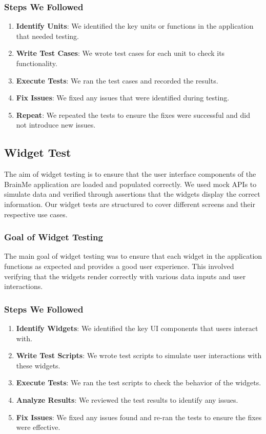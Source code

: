 \subsubsection{Steps We Followed}

\begin{enumerate}
    \item \textbf{Identify Units}: We identified the key units or functions in the application that needed testing.
    \item \textbf{Write Test Cases}: We wrote test cases for each unit to check its functionality.
    \item \textbf{Execute Tests}: We ran the test cases and recorded the results.
    \item \textbf{Fix Issues}: We fixed any issues that were identified during testing.
    \item \textbf{Repeat}: We repeated the tests to ensure the fixes were successful and did not introduce new issues.
\end{enumerate}

\subsection{Widget Test}

The aim of widget testing is to ensure that the user interface components of the BrainMe application are loaded and populated correctly. We used mock APIs to simulate data and verified through assertions that the widgets display the correct information. Our widget tests are structured to cover different screens and their respective use cases.

\subsubsection{Goal of Widget Testing}

The main goal of widget testing was to ensure that each widget in the application functions as expected and provides a good user experience. This involved verifying that the widgets render correctly with various data inputs and user interactions.

\subsubsection{Steps We Followed}

\begin{enumerate}
    \item \textbf{Identify Widgets}: We identified the key UI components that users interact with.
    \item \textbf{Write Test Scripts}: We wrote test scripts to simulate user interactions with these widgets.
    \item \textbf{Execute Tests}: We ran the test scripts to check the behavior of the widgets.
    \item \textbf{Analyze Results}: We reviewed the test results to identify any issues.
    \item \textbf{Fix Issues}: We fixed any issues found and re-ran the tests to ensure the fixes were effective.
\end{enumerate}

